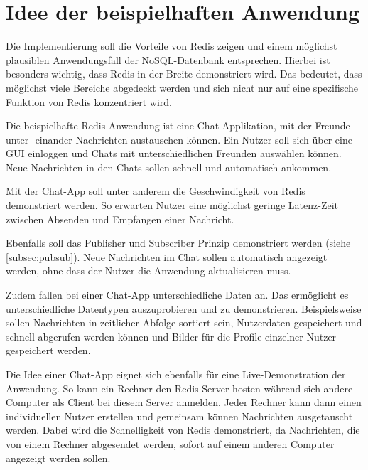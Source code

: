 
\section{Idee der beispielhaften Anwendung}

Die Implementierung soll die Vorteile von \ac{Redis} zeigen und einem möglichst plausiblen Anwendungsfall der \acs{NoSQL}-Datenbank entsprechen. Hierbei ist besonders wichtig, dass \ac{Redis} in der Breite demonstriert wird. Das bedeutet, dass möglichst viele Bereiche abgedeckt werden und sich nicht nur auf eine spezifische Funktion von \ac{Redis} konzentriert wird.

Die beispielhafte \ac{Redis}-Anwendung ist eine Chat-Applikation, mit der Freunde unter- einander Nachrichten austauschen können. Ein Nutzer soll sich über eine \ac{GUI} einloggen und Chats mit unterschiedlichen Freunden auswählen können. Neue Nachrichten in den Chats sollen schnell und automatisch ankommen. 

Mit der Chat-App soll unter anderem die Geschwindigkeit von \ac{Redis} demonstriert werden. So erwarten Nutzer eine möglichst geringe Latenz-Zeit zwischen Absenden und Empfangen einer Nachricht. 

Ebenfalls soll das Publisher und Subscriber Prinzip demonstriert werden (siehe \newline \autoref{subsec:pubsub}). Neue Nachrichten im Chat sollen automatisch angezeigt werden, ohne dass der Nutzer die Anwendung aktualisieren muss.

Zudem fallen bei einer Chat-App unterschiedliche Daten an. Das ermöglicht es unterschiedliche Datentypen auszuprobieren und zu demonstrieren. Beispielsweise sollen Nachrichten in zeitlicher Abfolge sortiert sein, Nutzerdaten gespeichert und schnell abgerufen werden können und Bilder für die Profile einzelner Nutzer gespeichert werden.

Die Idee einer Chat-App eignet sich ebenfalls für eine Live-Demonstration der Anwendung. So kann ein Rechner den \ac{Redis}-Server hosten während sich andere Computer als Client bei diesem Server anmelden. Jeder Rechner kann dann einen individuellen Nutzer erstellen und gemeinsam können Nachrichten ausgetauscht werden. Dabei wird die Schnelligkeit von \ac{Redis} demonstriert, da Nachrichten, die von einem Rechner abgesendet werden, sofort auf einem anderen Computer angezeigt werden sollen.